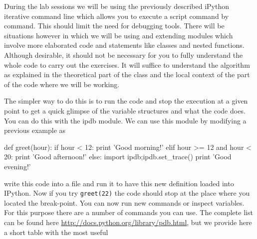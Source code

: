 During the lab sessions we will be using the previously described iPython iterative command line which allows you to execute a script command by command. This should limit the need for debugging tools. There will be situations however in which we will be using and extending modules which involve more elaborated code and statements like classes and nested functions. Although desirable, it should not be necessary for you to fully understand the whole code to carry out the exercises. It will suffice to understand the algorithm as explained in the theoretical part of the class and the local context of the part of the code where we will be working. 

The simpler way to do this is to run the code and stop the execution at a given point to get a quick glimpse of the variable structures and what the code does. You can do this with the ipdb module. We can use this module by modifying a previous example as 

\begin{python}
def greet(hour):
    if hour < 12:
        print 'Good morning!'
    elif hour >= 12 and hour < 20:
        print 'Good afternoon!'
    else:
        import ipdb;ipdb.set_trace()
        print 'Good evening!'
\end{python}

write this code into a file and run it to have this new definition loaded into IPython. Now if you try \texttt{greet(22)} the code should stop at the place where you located the break-point. You can now run new commands or inspect variables. For this purpose there are a number of commands you can use. The complete list can be found here \url{http://docs.python.org/library/pdb.html}, but we provide here a short table with the most useful  

